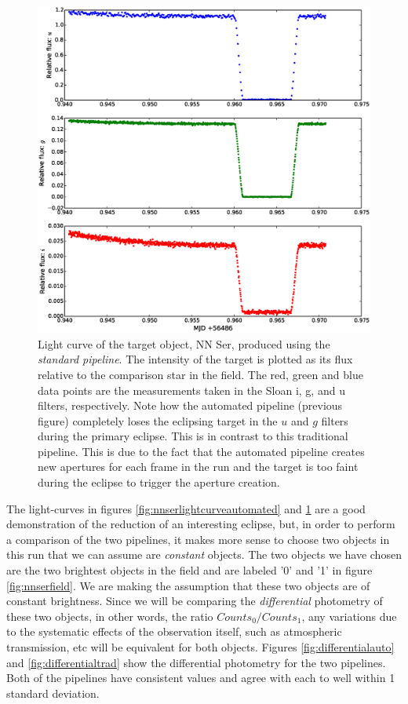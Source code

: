 \begin{figure}
\centering
\includegraphics[width=140mm]{images/nnser_lightcurve_tom.eps}
\caption{Light curve of the target object, NN Ser, produced using the \emph{standard pipeline}. The intensity of the target is plotted as its flux relative to the comparison star in the field. The red, green and blue data points are the measurements taken in the Sloan i, g, and u filters, respectively. Note how the automated pipeline (previous figure) completely loses the eclipsing target in the $u$ and $g$ filters during the primary eclipse. This is in contrast to this traditional pipeline. This is due to the fact that the automated pipeline creates new apertures for each frame in the run and the target is too faint during the eclipse to trigger the aperture creation.}
\label{fig:nnserlightcurvetom}
\end{figure}

The light-curves in figures \ref{fig:nnserlightcurveautomated} and \ref{fig:nnserlightcurvetom} are a good demonstration of the reduction of an interesting eclipse, but, in order to perform a comparison of the two pipelines, it makes more sense to choose two objects in this run that we can assume are \emph{constant} objects. The two objects we have chosen are the two brightest objects in the field and are labeled '0' and '1' in figure \ref{fig:nnserfield}. We are making the assumption that these two objects are of constant brightness. Since we will be comparing the \emph{differential} photometry of these two objects, in other words, the ratio $Counts_{0}/Counts_{1}$, any variations due to the systematic effects of the observation itself, such as atmospheric transmission, etc will be equivalent for both objects. Figures \ref{fig:differentialauto} and \ref{fig:differentialtrad} show the differential photometry for the two pipelines. Both of the pipelines have consistent values and agree with each to well within 1 standard deviation.


